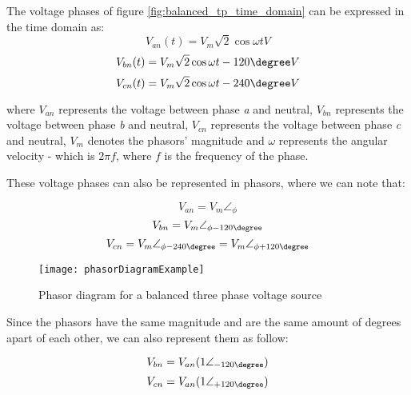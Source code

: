 The voltage phases of figure \ref{fig:balanced_tp_time_domain} can be expressed in the time domain as:
\begin{equation} \label{eq:balanced_tpVan_timedomain}
	V_{an}(t) = V_{m}\sqrt{2}\cos{\omega t} V
\end{equation}
\begin{equation} \label{eq:balanced_tpVan_timedomain}
	V_{bn}(t) = V_{m}\sqrt{2}\cos{\omega t - 120\degree} V
\end{equation}
\begin{equation} \label{eq:balanced_tpVan_timedomain}
	V_{cn}(t) = V_{m}\sqrt{2}\cos{\omega t - 240\degree} V
\end{equation}

where $V_{an}$ represents the voltage between phase \emph{a} and neutral, $V_{bn}$ represents the voltage between phase \emph{b} and neutral, $V_{cn}$ represents the voltage between phase \emph{c} and neutral, $V_{m}$ denotes the phasors' magnitude and $\omega$ represents the angular velocity - which is $2\pi f$, where $f$ is the frequency of the phase. 

These voltage phases can also be represented in phasors, where we can note that:

\begin{equation} \label{eq:balanced_tpVan}
	V_{an} = V_{m}\angle_{\phi}
\end{equation}
\begin{equation} \label{eq:balanced_tpVbn}
	V_{bn} = V_{m}\angle_{\phi - 120\degree} 
\end{equation}
\begin{equation} \label{eq:balanced_tpVcn}
	V_{cn} = V_{m}\angle_{\phi - 240\degree} = V_{m}\angle_{\phi + 120\degree} 
\end{equation}

\begin{figure}[htbp]
	\centering
	\texttt{[image: phasorDiagramExample]}
	\caption{Phasor diagram for a balanced three phase voltage source}
	\label{fig:balanced_tp_phasor_domain}
\end{figure}

Since the phasors have the same magnitude and are the same amount of degrees apart of each other, we can also represent them as follow:

\begin{equation} \label{eq:balanced_Vbn2}
	V_{bn} = V_{an}(1\angle_{-120\degree})
\end{equation}
\begin{equation} \label{eq:balanced_Vcn2}
	V_{cn} = V_{an}(1\angle_{+120\degree})
\end{equation}

